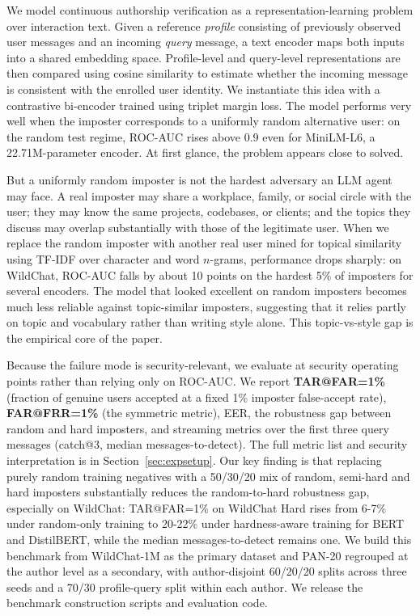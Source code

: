 \documentclass[11pt]{article}
\begin{document}
We model continuous authorship verification as a representation-learning problem over interaction text. Given a reference \emph{profile} consisting of previously observed user messages and an incoming \emph{query} message, a text encoder maps both inputs into a shared embedding space. Profile-level and query-level representations are then compared using cosine similarity to estimate whether the incoming message is consistent with the enrolled user identity. We instantiate this idea with a contrastive bi-encoder trained using triplet margin loss. The model performs very well when the imposter corresponds to a uniformly random alternative user: on the random test regime, ROC-AUC rises above 0.9 even for MiniLM-L6, a 22.71M-parameter encoder. At first glance, the problem appears close to solved.

But a uniformly random imposter is not the hardest adversary an LLM agent may face. A real imposter may share a workplace, family, or social circle with the user; they may know the same projects, codebases, or clients; and the topics they discuss may overlap substantially with those of the legitimate user. When we replace the random imposter with another real user mined for topical similarity using TF-IDF over character and word $n$-grams, performance drops sharply: on WildChat, ROC-AUC falls by about 10 points on the hardest 5\% of imposters for several encoders. The model that looked excellent on random imposters becomes much less reliable against topic-similar imposters, suggesting that it relies partly on topic and vocabulary rather than writing style alone. This topic-vs-style gap is the empirical core of the paper.

Because the failure mode is security-relevant, we evaluate at security operating points rather than relying only on ROC-AUC. We report \textbf{TAR@FAR=1\%} (fraction of genuine users accepted at a fixed 1\% imposter false-accept rate), \textbf{FAR@FRR=1\%} (the symmetric metric), EER, the robustness gap between random and hard imposters, and streaming metrics over the first three query messages (catch@3, median messages-to-detect). The full metric list and security interpretation is in Section~\ref{sec:expsetup}. Our key finding is that replacing purely random training negatives with a 50/30/20 mix of random, semi-hard and hard imposters substantially reduces the random-to-hard robustness gap, especially on WildChat: TAR@FAR=1\% on WildChat Hard rises from 6-7\% under random-only training to 20-22\% under hardness-aware training for BERT and DistilBERT, while the median messages-to-detect remains one. We build this benchmark from WildChat-1M \citep{zhao2024wildchat} as the primary dataset and PAN-20 \citep{bevendorff2020overview} regrouped at the author level as a secondary, with author-disjoint 60/20/20 splits across three seeds and a 70/30 profile-query split within each author. We release the benchmark construction scripts and evaluation code.
\end{document}
